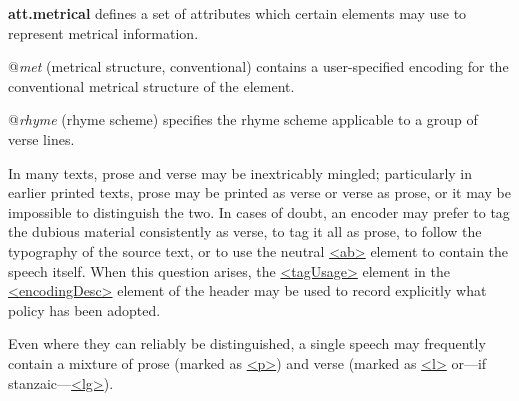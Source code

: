 \begin{sansreflist}
  
\item [\textbf{att.metrical}] defines a set of attributes which certain elements may use to represent metrical information.\hfil\\[-10pt]\begin{sansreflist}
    \item[@{\itshape met}]
  (metrical structure, conventional) contains a user-specified encoding for the conventional metrical structure of the element.
    \item[@{\itshape rhyme}]
  (rhyme scheme) specifies the rhyme scheme applicable to a group of verse lines.
\end{sansreflist}  
\end{sansreflist}
\par
In many texts, prose and verse may be inextricably mingled; particularly in earlier printed texts, prose may be printed as verse or verse as prose, or it may be impossible to distinguish the two. In cases of doubt, an encoder may prefer to tag the dubious material consistently as verse, to tag it all as prose, to follow the typography of the source text, or to use the neutral \hyperref[TEI.ab]{<ab>} element to contain the speech itself. When this question arises, the \hyperref[TEI.tagUsage]{<tagUsage>} element in the \hyperref[TEI.encodingDesc]{<encodingDesc>} element of the header may be used to record explicitly what policy has been adopted.\par
Even where they can reliably be distinguished, a single speech may frequently contain a mixture of prose (marked as \hyperref[TEI.p]{<p>}) and verse (marked as \hyperref[TEI.l]{<l>} or—if stanzaic—\hyperref[TEI.lg]{<lg>}).\par
